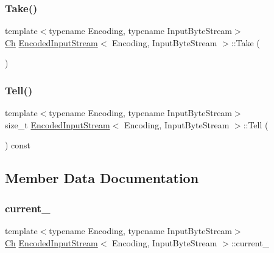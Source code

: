 \mbox{\label{classEncodedInputStream_ab42cd57581bf62e42af471583e5b8377}} 
\subsubsection{\texorpdfstring{Take()}{Take()}}
{\footnotesize\ttfamily template$<$typename Encoding, typename Input\+Byte\+Stream$>$ \\
\hyperlink{classEncodedInputStream_acc387a1364390da244bbb1ab07bdceca}{Ch} \hyperlink{classEncodedInputStream}{Encoded\+Input\+Stream}$<$ Encoding, Input\+Byte\+Stream $>$\+::Take (\begin{DoxyParamCaption}{ }\end{DoxyParamCaption})\hspace{0.3cm}{\ttfamily [inline]}}

\mbox{\label{classEncodedInputStream_afbe4ac0fc57fa992ba3aa5da8dc66527}} 
\subsubsection{\texorpdfstring{Tell()}{Tell()}}
{\footnotesize\ttfamily template$<$typename Encoding, typename Input\+Byte\+Stream$>$ \\
size\+\_\+t \hyperlink{classEncodedInputStream}{Encoded\+Input\+Stream}$<$ Encoding, Input\+Byte\+Stream $>$\+::Tell (\begin{DoxyParamCaption}{ }\end{DoxyParamCaption}) const\hspace{0.3cm}{\ttfamily [inline]}}



\subsection{Member Data Documentation}
\mbox{\label{classEncodedInputStream_a20b49879c87fdf6d6ba20e99f0cf7893}} 
\subsubsection{\texorpdfstring{current\+\_\+}{current\_}}
{\footnotesize\ttfamily template$<$typename Encoding, typename Input\+Byte\+Stream$>$ \\
\hyperlink{classEncodedInputStream_acc387a1364390da244bbb1ab07bdceca}{Ch} \hyperlink{classEncodedInputStream}{Encoded\+Input\+Stream}$<$ Encoding, Input\+Byte\+Stream $>$\+::current\+\_\+\hspace{0.3cm}{\ttfamily [private]}}

